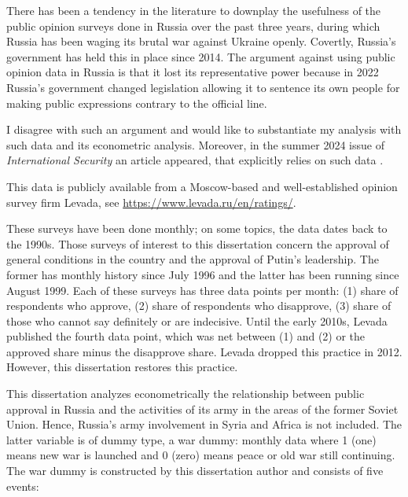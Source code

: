 \citep{levada2024,levada2015,iz2014,levada2013}

There has been a tendency in the literature to downplay the usefulness of the public opinion surveys done in Russia over the past three years, during which Russia has been waging its brutal war against Ukraine openly. Covertly, Russia's government has held this in place since 2014. The argument against using public opinion data in Russia is that it lost its representative power because in 2022 Russia's government changed legislation allowing it to sentence its own people for making public expressions contrary to the official line.

I disagree with such an argument and would like to substantiate my analysis with such data and its econometric analysis. Moreover, in the summer 2024 issue of \textit{International Security} an article appeared, that explicitly relies on such data \citep{hale2024}.

This data is publicly available from a Moscow-based and well-established opinion survey firm Levada, see {\small \url{https://www.levada.ru/en/ratings/}}.

These surveys have been done monthly; on some topics, the data dates back to the 1990s. Those surveys of interest to this dissertation concern the approval of general conditions in the country and the approval of Putin's leadership. The former has monthly history since July 1996 and the latter has been running since August 1999. Each of these surveys has three data points per month: (1) share of respondents who approve, (2) share of respondents who disapprove, (3) share of those who cannot say definitely or are indecisive. Until the early 2010s, Levada published the fourth data point, which was net between (1) and (2) or the approved share minus the disapprove share. Levada dropped this practice in 2012. However, this dissertation restores this practice. 

This dissertation analyzes econometrically the relationship between public approval in Russia and the activities of its army in the areas of the former Soviet Union. Hence, Russia's army involvement in Syria and Africa is not included. The latter variable is of dummy type, a war dummy: monthly data where 1 (one) means new war is launched and 0 (zero) means peace or old war still continuing. The war dummy is constructed by this dissertation author and consists of five events:

